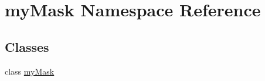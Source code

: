 \hypertarget{namespacemy_mask}{\section{my\-Mask Namespace Reference}
\label{namespacemy_mask}
}
\subsection*{Classes}
\begin{DoxyCompactItemize}
\item 
class \hyperlink{classmy_mask_1_1my_mask}{my\-Mask}
\end{DoxyCompactItemize}
